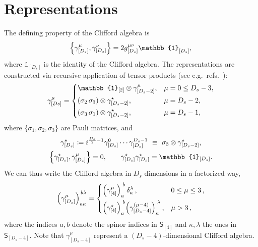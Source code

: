 \section{Representations}
The defining property of the Clifford algebra is
\begin{equation} \label{eqn:defClifford}
\acomm{\gamma_{[D_s]}^\mu}{\gamma_{[D_s]}^\nu} = 2 g_{[D_s]}^{\mu\nu}\mathbb{1}_{[D_s]}^{\vphantom{\mu\nu}},
\end{equation}
where $\mathbb{1}_{[D_s]}$ is the identity of the Clifford algebra.
The representations are constructed via recursive application of tensor products (see e.g.\ refs.~\cite{Collins:1984xc,Kreuzer:susylectures}):
\begin{align}\label{eq:gammait}
  \gamma^\mu_{[Ds]}  = 
  \begin{dcases}
    \mathbb{1}_{[2]} \otimes \gamma^\mu_{[D_s-2]}, & \mu =0\leq D_s-3,\\
    (\sigma_2\,\sigma_3) \otimes \gamma^\star_{[D_s-2]}, & \mu = D_s-2,\\
    (\sigma_3\,\sigma_1) \otimes \gamma^\star_{[D_s-2]}, & \mu = D_s-1,\\
  \end{dcases}
\end{align}
where $\{\sigma_1,\sigma_2,\sigma_3\}$ are Pauli matrices, and
\begin{equation}
  \begin{gathered}
    \gamma^\star_{[D_s]} \coloneqq i^{\frac{D_s}{2}-1} \gamma^0_{[D_s]}\cdots{}\gamma^{D_s -1 }_{[D_s]} ~\equiv~ \sigma_3 \otimes \gamma^\star_{[D_s-2]}, \\
    \acomm{\gamma^\star_{[D_s]}}{\gamma^\mu_{[D_s]}}=0, \qquad \gamma^\star_{[D_s]} \gamma^\star_{[D_s]} = \mathbb{1}_{[D_s]}.
  \end{gathered}
\end{equation}
We can thus write the Clifford algebra in $D_s$ dimensions in a factorized way,
\begin{equation}\label{eqn:cliffordrecursion}
  \qty(\gamma_{[D_s]}^\mu)_{a\kappa}^{\,b\lambda}  =
  \begin{dcases}
    \qty(\gamma_{[4]}^\mu)_a^{\;b} \, \delta_\kappa^\lambda\,, &  0\le\mu \le 3 \,,\\
    \qty(\gamma^{\star}_{[4]})_a^{\;b} \qty(\gamma_{[D_s-4]}^{(\mu-4)})_\kappa^{\;\lambda}\,, & \mu>3 \,,
  \end{dcases}
\end{equation}
where the indices $a,b$ denote the spinor indices in $\mathsf{S}_{[4]}$ and $\kappa,\lambda$ the ones in $\mathsf{S}_{[D_s - 4]}$.
Note that $\gamma^\mu_{[D_s-4]}$ represent a $(D_s-4)$-dimensional Clifford algebra.

